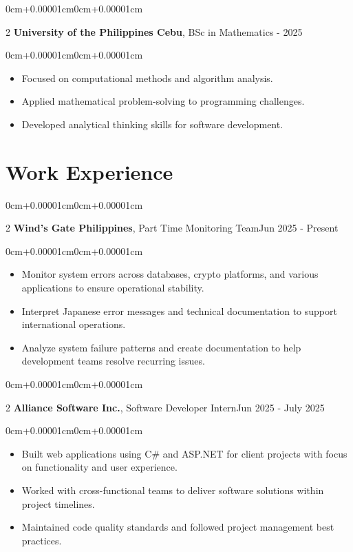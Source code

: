 \documentclass[10pt, letterpaper]{article}
\newenvironment{highlights}{\begin{itemize}[topsep=0.10cm,parsep=0.10cm,partopsep=0pt,itemsep=0pt,leftmargin=0cm+10pt]}{\end{itemize}}
\newenvironment{onecolentry}{\begin{adjustwidth}{0cm+0.00001cm}{0cm+0.00001cm}}{\end{adjustwidth}}
\newenvironment{twocolentry}[2][]{\onecolentry\def\secondColumn{#2}\setcolumnwidth{\fill,8cm}\begin{paracol}{2}}{\switchcolumn \raggedleft \secondColumn\end{paracol}\endonecolentry}
\begin{document}
    \begin{twocolentry}{2022 - 2025}
        \textbf{University of the Philippines Cebu}, BSc in Mathematics\end{twocolentry}
    \vspace{0.10cm}
    \begin{onecolentry}
        \begin{highlights}
            \item Focused on computational methods and algorithm analysis.
            \item Applied mathematical problem-solving to programming challenges.
            \item Developed analytical thinking skills for software development.
        \end{highlights}
    \end{onecolentry}
    \vspace{0.15cm}

\section{Work Experience}
    \begin{twocolentry}{Jun 2025 - Present}
        \textbf{Wind's Gate Philippines}, Part Time Monitoring Team\end{twocolentry}
    \vspace{0.10cm}
    \begin{onecolentry}
        \begin{highlights}
            \item Monitor system errors across databases, crypto platforms, and various applications to ensure operational stability.
            \item Interpret Japanese error messages and technical documentation to support international operations.
            \item Analyze system failure patterns and create documentation to help development teams resolve recurring issues.
        \end{highlights}
    \end{onecolentry}
    \vspace{0.15cm}

    \begin{twocolentry}{Jun 2025 - July 2025}
        \textbf{Alliance Software Inc.}, Software Developer Intern\end{twocolentry}
    \vspace{0.10cm}
    \begin{onecolentry}
        \begin{highlights}
            \item Built web applications using C\# and ASP.NET for client projects with focus on functionality and user experience.
            \item Worked with cross-functional teams to deliver software solutions within project timelines.
            \item Maintained code quality standards and followed project management best practices.
        \end{highlights}
    \end{onecolentry}
    \vspace{0.15cm}
\end{document}
